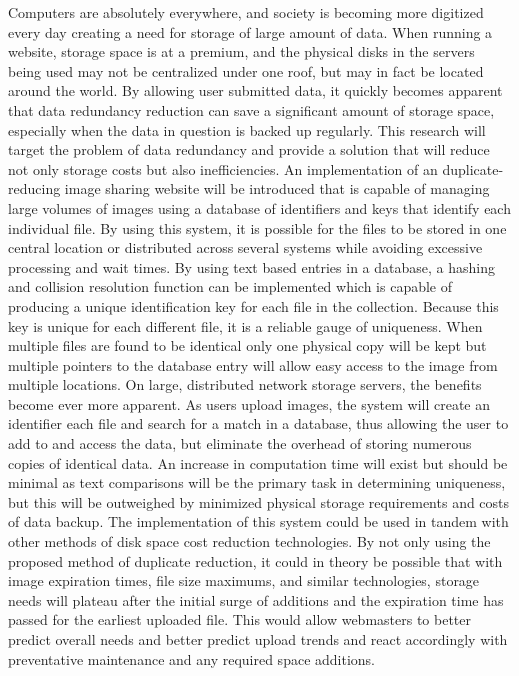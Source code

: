 \documentclass[11pt]{article}
\begin{document}
Computers are absolutely everywhere, and society is becoming more digitized every day creating
a need for storage of large amount of data. When running a website, storage space is at a
premium, and the physical disks in the servers being used may not be centralized under one roof, 
but may in fact be located around the world. By allowing user submitted data, it quickly becomes 
apparent that data redundancy reduction can save a significant amount of storage space, especially 
when the data in question is backed up regularly. This research will target
the problem of data redundancy and provide a solution that will reduce not only storage costs but
also inefficiencies. An implementation of an duplicate-reducing image sharing website will be introduced that is
capable of managing large volumes of images using a database of identifiers and keys
that identify each individual file. By using this system, it is possible for the files to be stored in one
central location or distributed across several systems while avoiding excessive processing and wait times.
By using text based entries in a database, a hashing and collision resolution function can be 
implemented which is capable of producing a unique identification key for each file in the collection. 
Because this key is unique for each different file, it is a reliable gauge of uniqueness. 
When multiple files are found to be identical only one physical copy will be kept but 
multiple pointers to the database entry will allow easy access to the image from multiple locations.
On large, distributed network storage servers, the benefits become ever more apparent. As users upload images, the system will create an identifier each file and search for a match in a database,
thus allowing the user to add to and access the data, but eliminate the overhead of storing numerous
copies of identical data. An increase in computation time will exist but should be minimal as
text comparisons will be the primary task in determining uniqueness, but this will be outweighed by
minimized physical storage requirements and costs of data backup.
The implementation of this system could be used in tandem with other methods of disk space cost reduction technologies. By not only using the proposed
method of duplicate reduction, it could in theory be possible that with image expiration times, file size maximums, and similar technologies, storage needs will plateau after the
initial surge of additions and the expiration time has passed for the earliest uploaded file. This
would allow webmasters to better predict overall needs and better predict upload trends and react
accordingly with preventative maintenance and any required space additions.
\end{document}
